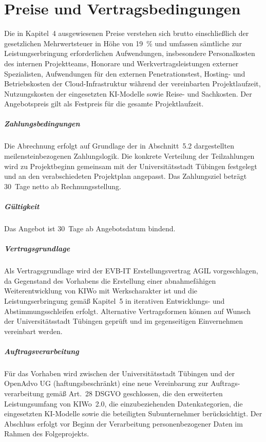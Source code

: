 \chapter{Preise und Vertragsbedingungen}

Die in Kapitel~4 ausgewiesenen Preise verstehen sich brutto einschließlich
der gesetzlichen Mehrwertsteuer in Höhe von 19~\% und umfassen sämtliche
zur Leistungserbringung erforderlichen Aufwendungen, insbesondere
Personalkosten des internen Projektteams, Honorare und Werkvertragsleistungen
externer Spezialisten, Aufwendungen für den externen Penetrationstest,
Hosting- und Betriebskosten der Cloud-Infrastruktur während der vereinbarten
Projektlaufzeit, Nutzungskosten der eingesetzten KI-Modelle sowie Reise-
und Sachkosten. Der Angebotspreis gilt als Festpreis für die gesamte
Projektlaufzeit.

\paragraph{Zahlungsbedingungen}
Die Abrechnung erfolgt auf Grundlage der in Abschnitt~5.2 dargestellten
meilensteinbezogenen Zahlungslogik. Die konkrete Verteilung der
Teilzahlungen wird zu Projektbeginn gemeinsam mit der Universitätsstadt
Tübingen festgelegt und an den verabschiedeten Projektplan angepasst.
Das Zahlungsziel beträgt 30~Tage netto ab Rechnungsstellung.

\paragraph{Gültigkeit}
Das Angebot ist 30~Tage ab Angebotsdatum bindend.

\paragraph{Vertragsgrundlage}
Als Vertragsgrundlage wird der EVB-IT Erstellungsvertrag AGIL vorgeschlagen,
da Gegenstand des Vorhabens die Erstellung einer abnahmefähigen
Weiterentwicklung von KIWo mit Werkscharakter ist und die Leistungserbringung
gemäß Kapitel~5 in iterativen Entwicklungs- und Abstimmungsschleifen
erfolgt. Alternative Vertragsformen können auf Wunsch der Universitätsstadt
Tübingen geprüft und im gegenseitigen Einvernehmen vereinbart werden.

\paragraph{Auftragsverarbeitung}
Für das Vorhaben wird zwischen der Universitätsstadt Tübingen und der
OpenAdvo UG (haftungsbeschränkt) eine neue Vereinbarung zur Auftrags-
verarbeitung gemäß Art.~28 DSGVO geschlossen, die den erweiterten
Leistungsumfang von KIWo~2.0, die einzubeziehenden Datenkategorien, die
eingesetzten KI-Modelle sowie die beteiligten Subunternehmer berücksichtigt.
Der Abschluss erfolgt vor Beginn der Verarbeitung personenbezogener Daten
im Rahmen des Folgeprojekts.

